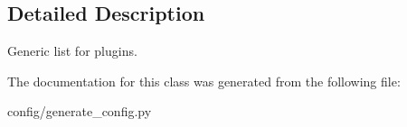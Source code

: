 \subsection{Detailed Description}
Generic list for plugins. 

The documentation for this class was generated from the following file:\begin{CompactItemize}
\item 
config/generate\_\-config.py\end{CompactItemize}
